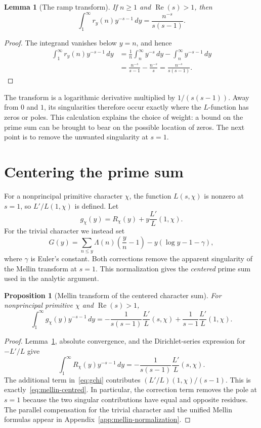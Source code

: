 \documentclass[11pt,openany,oneside]{scrbook}
\newtheorem{proposition}[theorem]{Proposition}
\newtheorem{lemma}[theorem]{Lemma}
\theoremstyle{definition}
\theoremstyle{remark}
\newcommand{\Rea}{\operatorname{Re}}
\begin{document}
\begin{lemma}[The ramp transform]\label{lem:ramp}
If $n\ge1$ and $\Rea(s)>1$, then
\[
 \int_1^\infty r_y(n)y^{-s-1}\,dy
 =\frac{n^{-s}}{s(s-1)}.
\]
\end{lemma}
\begin{proof}
The integrand vanishes below $y=n$, and hence
\[
\begin{aligned}
\int_1^\infty r_y(n)y^{-s-1}\,dy
&=\frac1n\int_n^\infty y^{-s}\,dy-\int_n^\infty y^{-s-1}\,dy\\
&=\frac{n^{-s}}{s-1}-\frac{n^{-s}}s
 =\frac{n^{-s}}{s(s-1)}.
\end{aligned}
\]
\end{proof}

The transform is a logarithmic derivative multiplied by $1/(s(s-1))$. Away from $0$ and $1$, its singularities therefore occur exactly where the $L$-function has zeros or poles. This calculation explains the choice of weight: a bound on the prime sum can be brought to bear on the possible location of zeros. The next point is to remove the unwanted singularity at $s=1$.

\section{Centering the prime sum}

For a nonprincipal primitive character $\chi$, the function $L(s,\chi)$ is nonzero at $s=1$, so $L'/L(1,\chi)$ is defined. Let
\begin{equation}\label{eq:gchi}
g_\chi(y)=R_\chi(y)+y\frac{L'}{L}(1,\chi).
\end{equation}
For the trivial character we instead set
\begin{equation}\label{eq:Gtriv}
G(y)=\sum_{n\le y}\Lambda(n)\left(\frac yn-1\right)
-y(\log y-1-\gamma),
\end{equation}
where $\gamma$ is Euler's constant. Both corrections remove the apparent singularity of the Mellin transform at $s=1$. This normalization gives the \emph{centered} prime sum used in the analytic argument.

\begin{proposition}[Mellin transform of the centered character sum]\label{prop:transform}
For nonprincipal primitive $\chi$ and $\Rea(s)>1$,
\begin{equation}\label{eq:mellin-centred}
\int_1^\infty g_\chi(y)y^{-s-1}\,dy
=-\frac1{s(s-1)}\frac{L'}{L}(s,\chi)+\frac1{s-1}\frac{L'}{L}(1,\chi).
\end{equation}
\end{proposition}
\begin{proof}
Lemma~\ref{lem:ramp}, absolute convergence, and the Dirichlet-series expression for $-L'/L$ give
\[
\int_1^\infty R_\chi(y)y^{-s-1}\,dy
=-\frac1{s(s-1)}\frac{L'}{L}(s,\chi).
\]
The additional term in~\eqref{eq:gchi} contributes $(L'/L)(1,\chi)/(s-1)$. This is exactly~\eqref{eq:mellin-centred}. In particular, the correction term removes the pole at $s=1$ because the two singular contributions have equal and opposite residues. The parallel compensation for the trivial character and the unified Mellin formulas appear in Appendix~\ref{app:mellin-normalization}.
\end{proof}
\end{document}
